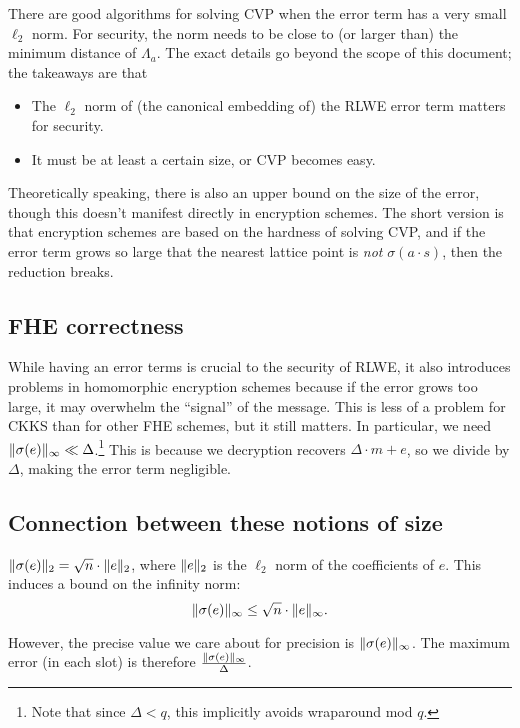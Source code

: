 \documentclass[../fheimpl.tex]{subfiles}
\begin{document}
There are good algorithms for solving CVP when the error term has a very small $\ell_2$ norm. For security, the norm needs to be close to (or larger than) the minimum distance of $\Lambda_a$. The exact details go beyond the scope of this document; the takeaways are that
\begin{itemize}
    \item The $\ell_2$ norm of (the canonical embedding of) the RLWE error term matters for security.
    \item It must be at least a certain size, or CVP becomes easy.
\end{itemize}

Theoretically speaking, there is also an upper bound on the size of the error, though this doesn't manifest directly in encryption schemes. The short version is that encryption schemes are based on the hardness of solving CVP, and if the error term grows so large that the nearest lattice point is \emph{not} $\sigma(a\cdot s)$, then the reduction breaks.

\subsection{FHE correctness}
While having an error terms is crucial to the security of RLWE, it also introduces problems in homomorphic encryption schemes because if the error grows too large, it may overwhelm the ``signal'' of the message. This is less of a problem for CKKS than for other FHE schemes, but it still matters. In particular, we need $\lVert\sigma(e)\rVert_\infty\ll \Delta$.\footnote{Note that since $\Delta < q$, this implicitly avoids wraparound mod $q$.} This is because we decryption recovers $\Delta\cdot m + e$, so we divide by $\Delta$, making the error term negligible.


\subsection{Connection between these notions of size}

$\lVert\sigma(e)\rVert_2 = \sqrt{n}\cdot\lVert e\rVert_2$, where $\lVert e\rVert_2$ is the $\ell_2$ norm of the coefficients of $e$. This induces a bound on the infinity norm:
\[\lVert\sigma(e)\rVert_\infty\le \sqrt{n}\cdot \lVert e\rVert_\infty.\]

However, the precise value we care about for precision is $\lVert\sigma(e)\rVert_\infty$. The maximum error (in each slot) is therefore $\frac{\lVert\sigma(e)\rVert_\infty}{\Delta}$.
\end{document}
